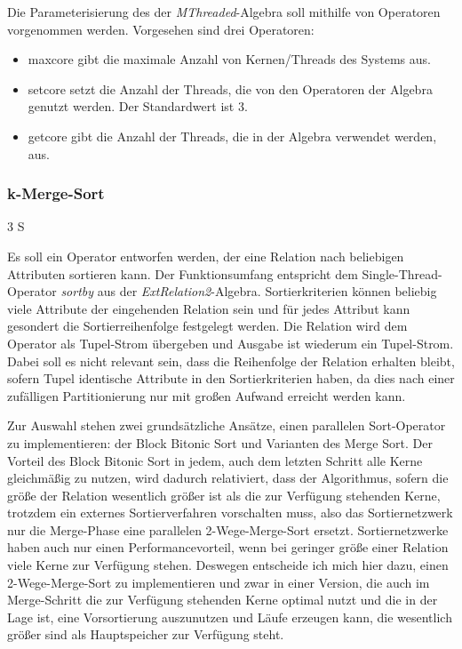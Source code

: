 \documentclass[a4paper,12pt,twoside]{article}
\newcommand{\Fb}[1]{\textit{#1}} %
\begin{document}
Die Parameterisierung des der \Fb{MThreaded}-Algebra soll mithilfe von Operatoren vorgenommen werden. Vorgesehen sind drei Operatoren:

\begin{itemize}
	\item maxcore gibt die maximale Anzahl von Kernen/Threads des Systems aus.
	\item setcore setzt die Anzahl der Threads, die von den Operatoren der Algebra genutzt werden. Der Standardwert ist 3.
	\item getcore gibt die Anzahl der Threads, die in der Algebra verwendet werden, aus.
\end{itemize}

\subsubsection{k-Merge-Sort} 3 S
\label{entw:sort}

Es soll ein Operator entworfen werden, der eine Relation nach beliebigen Attributen sortieren kann. Der Funktionsumfang entspricht dem Single-Thread-Operator \Fb{sortby} aus der \Fb{ExtRelation2}-Algebra. Sortierkriterien können beliebig viele Attribute der eingehenden Relation sein und für jedes Attribut kann gesondert die Sortierreihenfolge festgelegt werden. Die Relation wird dem Operator als Tupel-Strom übergeben und Ausgabe ist wiederum ein Tupel-Strom. Dabei soll es nicht relevant sein, dass die Reihenfolge der Relation erhalten bleibt, sofern Tupel identische Attribute in den Sortierkriterien haben, da dies nach einer zufälligen Partitionierung nur mit großen Aufwand erreicht werden kann.

Zur Auswahl stehen zwei grundsätzliche Ansätze, einen parallelen Sort-Operator zu implementieren: der Block Bitonic Sort und Varianten des Merge Sort. Der Vorteil des Block Bitonic Sort in jedem, auch dem letzten Schritt alle Kerne gleichmäßig zu nutzen, wird dadurch relativiert, dass der Algorithmus, sofern die größe der Relation wesentlich größer ist als die zur Verfügung stehenden Kerne, trotzdem ein externes Sortierverfahren vorschalten muss, also das Sortiernetzwerk nur die Merge-Phase eine parallelen 2-Wege-Merge-Sort ersetzt. Sortiernetzwerke haben auch nur einen Performancevorteil, wenn bei geringer größe einer Relation viele Kerne zur Verfügung stehen. Deswegen entscheide ich mich hier dazu, einen 2-Wege-Merge-Sort zu implementieren und zwar in einer Version, die auch im Merge-Schritt die zur Verfügung stehenden Kerne optimal nutzt und die in der Lage ist, eine Vorsortierung auszunutzen und Läufe erzeugen kann, die wesentlich größer sind als Hauptspeicher zur Verfügung steht.
\end{document}
